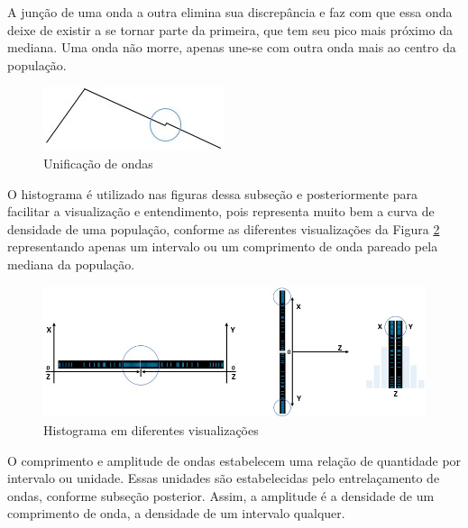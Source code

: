 A junção de uma onda a outra elimina sua discrepância e faz com que essa onda deixe de existir a se tornar parte da primeira, que tem seu pico mais próximo da mediana. Uma onda não morre, apenas une-se com outra onda mais ao centro da população.
	\begin{figure}[H]
	\caption{Unificação de ondas}
	\label{fig:consciousness_uniform_wave}
	\centering
	\includegraphics[scale=1]{sections/images/consciousness_uniform_wave.jpg}
	\end{figure}

O histograma é utilizado nas figuras dessa subseção e posteriormente para facilitar a visualização e entendimento, pois representa muito bem a curva de densidade de uma população, conforme as diferentes visualizações da Figura \ref{fig:consciousness_wave_histogram} representando apenas um intervalo ou um comprimento de onda pareado pela mediana da população.  
	\begin{figure}[H]
	\caption{Histograma em diferentes visualizações }
	\label{fig:consciousness_wave_histogram}
	\centering
	\includegraphics[scale=.7]{sections/images/consciousness_wave_histogram.jpg}
	\end{figure}
O comprimento e amplitude de ondas estabelecem uma relação de quantidade por intervalo ou unidade. Essas unidades são estabelecidas pelo entrelaçamento de ondas, conforme subseção posterior. Assim, a amplitude é a densidade de um comprimento de onda, a densidade de um intervalo qualquer.  


